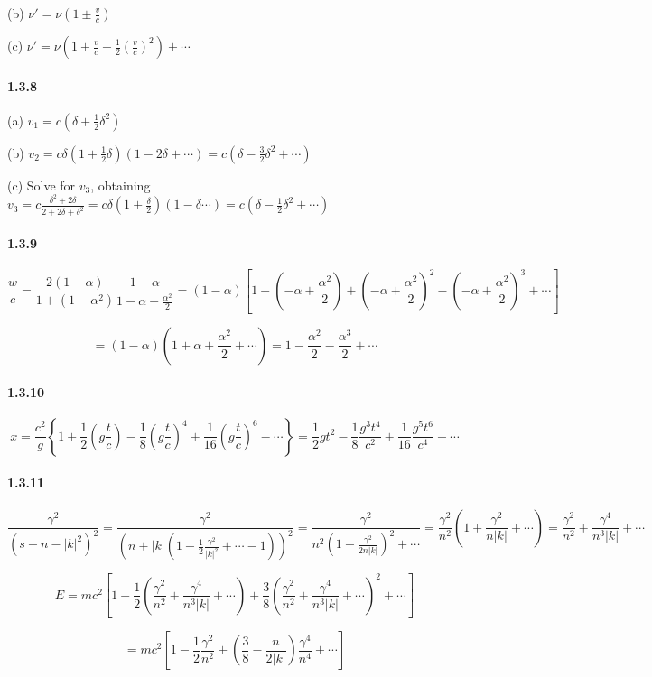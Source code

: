 \documentclass[a4paper]{article}
\begin{document}
(b) $\nu'=\nu(1\pm \frac{v}{c})$

(c) $\nu'=\nu(1\pm\frac{v}{c}+\frac{1}{2}(\frac{v}{c})^2)+\cdots$

\paragraph{1.3.8}
(a) $v_1=c(\delta+\frac{1}{2}\delta^2)$

(b) $v_2=c\delta(1+\frac{1}{2}\delta)(1-2\delta+\cdots)=c(\delta-\frac{3}{2}\delta^2+\cdots)$

(c) Solve for $v_3$, obtaining $v_3=c\frac{\delta^2+2\delta}{2+2\delta+\delta^2}=c\delta(1+\frac{\delta}{2})(1-\delta\cdots)=c(\delta-\frac{1}{2}\delta^2+\cdots)$

\paragraph{1.3.9}
\[\frac{w}{c}=\frac{2(1-\alpha)}{1+(1-\alpha^2)}\frac{1-\alpha}{1-\alpha+\frac{\alpha^2}{2}}=(1-\alpha)\left[1-(-\alpha+\frac{\alpha^2}{2})+(-\alpha+\frac{\alpha^2}{2})^2-(-\alpha+\frac{\alpha^2}{2})^3+\cdots\right]\]

\[=(1-\alpha)(1+\alpha+\frac{\alpha^2}{2}+\cdots)=1-\frac{\alpha^2}{2}-\frac{\alpha^3}{2}+\cdots\]

\paragraph{1.3.10}
\[x=\frac{c^2}{g}\left\{ 1+\frac{1}{2}\left(g\frac{t}{c}\right)-\frac{1}{8}\left(g\frac{t}{c}\right)^4+\frac{1}{16}\left(g\frac{t}{c}\right)^6-\cdots \right\}=\frac{1}{2}gt^2-\frac{1}{8}\frac{g^3t^4}{c^2}+\frac{1}{16}\frac{g^5t^6}{c^4}-\cdots\]

\paragraph{1.3.11}
\[\frac{\gamma^2}{(s+n-|k|^2)^2}=\frac{\gamma^2}{\left(n+|k|(1-\frac{1}{2}\frac{\gamma^2}{|k|^2}+\cdots-1)\right)^2}=\frac{\gamma^2}{n^2(1-\frac{\gamma^2}{2n|k|})^2+\cdots}=\frac{\gamma^2}{n^2}(1+\frac{\gamma^2}{n|k|}+\cdots)=\frac{\gamma^2}{n^2}+\frac{\gamma^4}{n^3|k|}+\cdots\]

\[E=mc^2\left[1-\frac{1}{2}\left(\frac{\gamma^2}{n^2}+\frac{\gamma^4}{n^3|k|}+\cdots\right)+\frac{3}{8}\left(\frac{\gamma^2}{n^2}+\frac{\gamma^4}{n^3|k|}+\cdots\right)^2 +\cdots\right]\]

\[=mc^2\left[1-\frac{1}{2}\frac{\gamma^2}{n^2}+(\frac{3}{8}-\frac{n}{2|k|})\frac{\gamma^4}{n^4}+\cdots \right] \]
\end{document}
